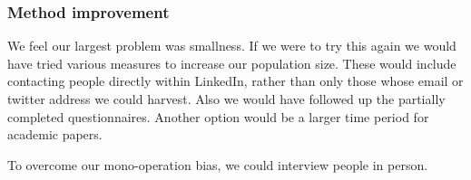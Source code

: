\subsubsection{Method improvement}
We feel our largest problem was smallness.
If we were to try this again we would have tried various measures to increase our population size.
These would include contacting people directly within LinkedIn, rather than only those whose email or twitter address we could harvest.
Also we would have followed up the partially completed questionnaires.
Another option would be a larger time period for academic papers.

To overcome our mono-operation bias, we could interview people in person.